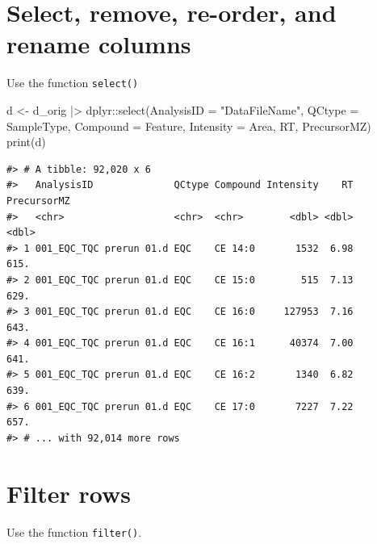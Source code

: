 \documentclass[
  letterpaper,
  DIV=11,
  numbers=noendperiod]{scrreprt}
\newenvironment{Shaded}{\begin{snugshade}}{\end{snugshade}}
\newcommand{\AttributeTok}[1]{\textcolor[rgb]{0.40,0.45,0.13}{#1}}
\newcommand{\FunctionTok}[1]{\textcolor[rgb]{0.28,0.35,0.67}{#1}}
\newcommand{\NormalTok}[1]{\textcolor[rgb]{0.00,0.23,0.31}{#1}}
\newcommand{\OtherTok}[1]{\textcolor[rgb]{0.00,0.23,0.31}{#1}}
\newcommand{\SpecialCharTok}[1]{\textcolor[rgb]{0.37,0.37,0.37}{#1}}
\newcommand{\StringTok}[1]{\textcolor[rgb]{0.13,0.47,0.30}{#1}}
\begin{document}
\hypertarget{select-remove-re-order-and-rename-columns}{%
\section{Select, remove, re-order, and rename
columns}\label{select-remove-re-order-and-rename-columns}}

Use the function \texttt{select()}

\begin{Shaded}
\begin{Highlighting}[]
\NormalTok{d }\OtherTok{\textless{}{-}}\NormalTok{ d\_orig }\SpecialCharTok{|\textgreater{}} 
\NormalTok{  dplyr}\SpecialCharTok{::}\FunctionTok{select}\NormalTok{(}\AttributeTok{AnalysisID =} \StringTok{"DataFileName"}\NormalTok{, }
                \AttributeTok{QCtype =}\NormalTok{ SampleType,}
                \AttributeTok{Compound =}\NormalTok{ Feature, }
                \AttributeTok{Intensity =}\NormalTok{ Area,}
\NormalTok{                RT,}
\NormalTok{                PrecursorMZ)}
\FunctionTok{print}\NormalTok{(d)}
\end{Highlighting}
\end{Shaded}

\begin{verbatim}
#> # A tibble: 92,020 x 6
#>   AnalysisID              QCtype Compound Intensity    RT PrecursorMZ
#>   <chr>                   <chr>  <chr>        <dbl> <dbl>       <dbl>
#> 1 001_EQC_TQC prerun 01.d EQC    CE 14:0       1532  6.98        615.
#> 2 001_EQC_TQC prerun 01.d EQC    CE 15:0        515  7.13        629.
#> 3 001_EQC_TQC prerun 01.d EQC    CE 16:0     127953  7.16        643.
#> 4 001_EQC_TQC prerun 01.d EQC    CE 16:1      40374  7.00        641.
#> 5 001_EQC_TQC prerun 01.d EQC    CE 16:2       1340  6.82        639.
#> 6 001_EQC_TQC prerun 01.d EQC    CE 17:0       7227  7.22        657.
#> # ... with 92,014 more rows
\end{verbatim}

\hypertarget{filter-rows}{%
\section{Filter rows}\label{filter-rows}}

Use the function \texttt{filter()}.
\end{document}
